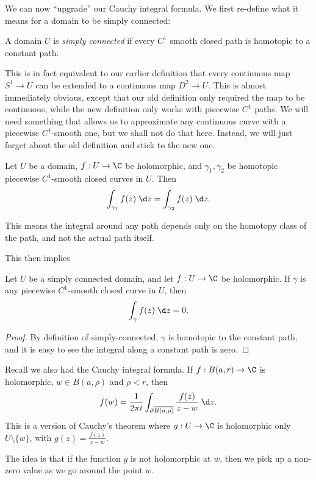 \documentclass[a4paper]{article}
\begin{document}
We can now ``upgrade'' our Cauchy integral formula. We first re-define what it means for a domain to be simply connected:
\begin{defi}
  A domain $U$ is \emph{simply connected} if every $C^1$ smooth closed path is homotopic to a constant path.
\end{defi}
This is in fact equivalent to our earlier definition that every continuous map $S^1 \to U$ can be extended to a continuous map $D^2 \to U$. This is almost immediately obvious, except that our old definition only required the map to be continuous, while the new definition only works with piecewise $C^1$ paths. We will need something that allows us to approximate any continuous curve with a piecewise $C^1$-smooth one, but we shall not do that here. Instead, we will just forget about the old definition and stick to the new one.

\begin{cor}
  Let $U$ be a domain, $f: U \to \C$ be holomorphic, and $\gamma_1, \gamma_2$ be homotopic piecewise $C^1$-smooth closed curves in $U$. Then
  \[
    \int_{\gamma_1}f(z)\;\d z = \int_{\gamma_2}f(z)\;\d z.
  \]
\end{cor}
This means the integral around any path depends only on the homotopy class of the path, and not the actual path itself.

This then implies
\begin{cor}
  Let $U$ be a simply connected domain, and let $f: U \to \C$ be holomorphic. If $\gamma$ is any piecewise $C^1$-smooth closed curve in $U$, then
  \[
    \int_\gamma f(z)\;\d z = 0.
  \]
\end{cor}

\begin{proof}
  By definition of simply-connected, $\gamma$ is homotopic to the constant path, and it is easy to see the integral along a constant path is zero.
\end{proof}

Recall we also had the Cauchy integral formula. If $f: B(a, r) \to \C$ is holomorphic, $w \in B(a, \rho)$ and $\rho < r$, then
\[
  f(w) = \frac{1}{2\pi i} \int_{\partial \overline{B(a, \rho)}} \frac{f(z)}{z - w}\;\d z.
\]
This is a version of Cauchy's theorem where $g: U \to \C$ is holomorphic only $U\setminus \{w\}$, with $g(z) = \frac{f(z)}{z - w}$.

The idea is that if the function $g$ is not holomorphic at $w$, then we pick up a non-zero value as we go around the point $w$.
\end{document}
